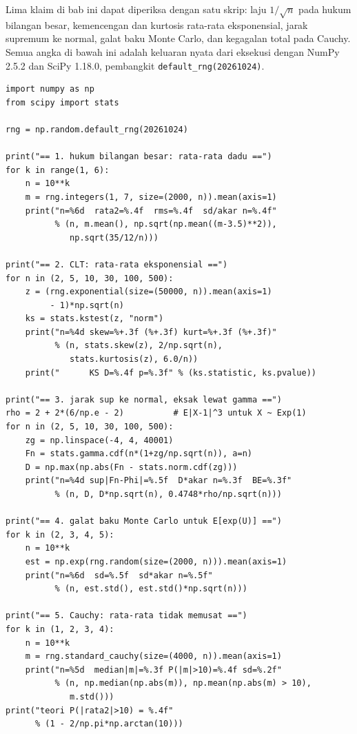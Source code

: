 Lima klaim di bab ini dapat diperiksa dengan satu skrip: laju $1/\sqrt n$ pada
hukum bilangan besar, kemencengan dan kurtosis rata-rata eksponensial, jarak
supremum ke normal, galat baku Monte Carlo, dan kegagalan total pada Cauchy.
Semua angka di bawah ini adalah keluaran nyata dari eksekusi dengan NumPy 2.5.2
dan SciPy 1.18.0, pembangkit \texttt{default\_rng(20261024)}.

\begin{lab}
\begin{verbatim}
import numpy as np
from scipy import stats

rng = np.random.default_rng(20261024)

print("== 1. hukum bilangan besar: rata-rata dadu ==")
for k in range(1, 6):
    n = 10**k
    m = rng.integers(1, 7, size=(2000, n)).mean(axis=1)
    print("n=%6d  rata2=%.4f  rms=%.4f  sd/akar n=%.4f"
          % (n, m.mean(), np.sqrt(np.mean((m-3.5)**2)),
             np.sqrt(35/12/n)))

print("== 2. CLT: rata-rata eksponensial ==")
for n in (2, 5, 10, 30, 100, 500):
    z = (rng.exponential(size=(50000, n)).mean(axis=1)
         - 1)*np.sqrt(n)
    ks = stats.kstest(z, "norm")
    print("n=%4d skew=%+.3f (%+.3f) kurt=%+.3f (%+.3f)"
          % (n, stats.skew(z), 2/np.sqrt(n),
             stats.kurtosis(z), 6.0/n))
    print("      KS D=%.4f p=%.3f" % (ks.statistic, ks.pvalue))

print("== 3. jarak sup ke normal, eksak lewat gamma ==")
rho = 2 + 2*(6/np.e - 2)          # E|X-1|^3 untuk X ~ Exp(1)
for n in (2, 5, 10, 30, 100, 500):
    zg = np.linspace(-4, 4, 40001)
    Fn = stats.gamma.cdf(n*(1+zg/np.sqrt(n)), a=n)
    D = np.max(np.abs(Fn - stats.norm.cdf(zg)))
    print("n=%4d sup|Fn-Phi|=%.5f  D*akar n=%.3f  BE=%.3f"
          % (n, D, D*np.sqrt(n), 0.4748*rho/np.sqrt(n)))

print("== 4. galat baku Monte Carlo untuk E[exp(U)] ==")
for k in (2, 3, 4, 5):
    n = 10**k
    est = np.exp(rng.random(size=(2000, n))).mean(axis=1)
    print("n=%6d  sd=%.5f  sd*akar n=%.5f"
          % (n, est.std(), est.std()*np.sqrt(n)))

print("== 5. Cauchy: rata-rata tidak memusat ==")
for k in (1, 2, 3, 4):
    n = 10**k
    m = rng.standard_cauchy(size=(4000, n)).mean(axis=1)
    print("n=%5d  median|m|=%.3f P(|m|>10)=%.4f sd=%.2f"
          % (n, np.median(np.abs(m)), np.mean(np.abs(m) > 10),
             m.std()))
print("teori P(|rata2|>10) = %.4f"
      % (1 - 2/np.pi*np.arctan(10)))
\end{verbatim}
\end{lab}

